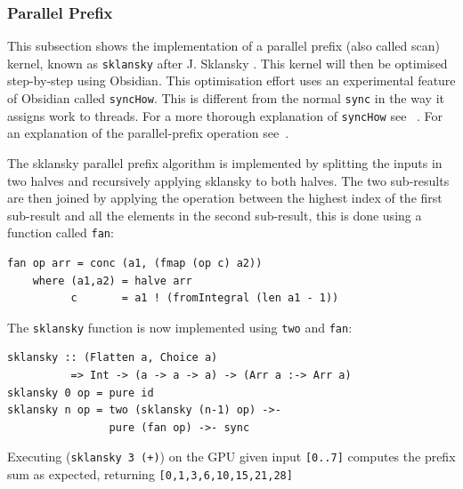 \subsubsection{Parallel Prefix}
\FloatBarrier

This subsection shows the implementation of a parallel prefix (also called scan) 
kernel, known as {\tt sklansky} after J. Sklansky \cite{Sklansky}.
This kernel will then be optimised step-by-step using Obsidian. This 
optimisation effort uses an experimental feature of Obsidian called {\tt syncHow}. 
This is different from the normal {\tt sync} in the way it assigns work to threads. 
For a more thorough explanation of {\tt syncHow} see ~\cite{JSTECH}.
For an explanation of the parallel-prefix operation see~\cite{BlellochTR90}. 

The sklansky parallel prefix algorithm 
is implemented by splitting the inputs in two halves and recursively 
applying sklansky to both halves. The two sub-results are then 
joined by applying the operation between the highest index of the first
sub-result and all the elements in the second sub-result, this is done 
using a function called {\tt fan}: 

\begin{small}
\begin{verbatim}
fan op arr = conc (a1, (fmap (op c) a2)) 
    where (a1,a2) = halve arr
          c       = a1 ! (fromIntegral (len a1 - 1))
\end{verbatim}
\end{small}
\noindent
The {\tt sklansky} function is now implemented using 
{\tt two} and {\tt fan}: 

\begin{small}
\begin{verbatim}
sklansky :: (Flatten a, Choice a) 
          => Int -> (a -> a -> a) -> (Arr a :-> Arr a) 
sklansky 0 op = pure id
sklansky n op = two (sklansky (n-1) op) ->- 
                pure (fan op) ->- sync
\end{verbatim}
\end{small}

Executing ({\tt sklansky 3 (+)}) on the GPU given input {\tt [0..7]} computes
the prefix sum as expected, returning {\tt [0,1,3,6,10,15,21,28]} 


